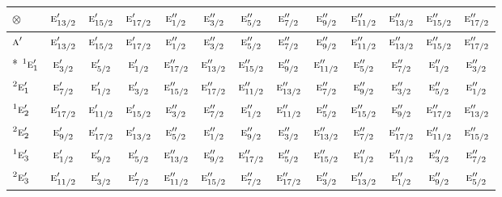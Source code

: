 \documentclass[10pt,a4paper]{article}
\numberwithin{equation}{section}
\newcommand{\irr}[1]{\text{\normalfont\scshape #1}}
\newcommand{\conjpair}[1]{{}^{#1}}
\newcommand{\irrprod}{\otimes}
\begin{document}
{\small\setlength{\tabcolsep}{3pt}\begin{longtable}{@{}lcccccccccccc@{}}\toprule
$\irrprod$ & $\irr{e}_{13/2}'$ & $\irr{e}_{15/2}'$ & $\irr{e}_{17/2}'$ & $\irr{e}_{1/2}''$ & $\irr{e}_{3/2}''$ & $\irr{e}_{5/2}''$ & $\irr{e}_{7/2}''$ & $\irr{e}_{9/2}''$ & $\irr{e}_{11/2}''$ & $\irr{e}_{13/2}''$ & $\irr{e}_{15/2}''$ & $\irr{e}_{17/2}''$\\\midrule\endhead
\bottomrule\endfoot\endlastfoot
$\irr{a}'$ & $\irr{e}_{13/2}'$ & $\irr{e}_{15/2}'$ & $\irr{e}_{17/2}'$ & $\irr{e}_{1/2}''$ & $\irr{e}_{3/2}''$ & $\irr{e}_{5/2}''$ & $\irr{e}_{7/2}''$ & $\irr{e}_{9/2}''$ & $\irr{e}_{11/2}''$ & $\irr{e}_{13/2}''$ & $\irr{e}_{15/2}''$ & $\irr{e}_{17/2}''$\\*
$\conjpair{1}\irr{e}_{1}'$ & $\irr{e}_{3/2}'$ & $\irr{e}_{5/2}'$ & $\irr{e}_{1/2}'$ & $\irr{e}_{17/2}''$ & $\irr{e}_{13/2}''$ & $\irr{e}_{15/2}''$ & $\irr{e}_{9/2}''$ & $\irr{e}_{11/2}''$ & $\irr{e}_{5/2}''$ & $\irr{e}_{7/2}''$ & $\irr{e}_{1/2}''$ & $\irr{e}_{3/2}''$\\
$\conjpair{2}\irr{e}_{1}'$ & $\irr{e}_{7/2}'$ & $\irr{e}_{1/2}'$ & $\irr{e}_{3/2}'$ & $\irr{e}_{15/2}''$ & $\irr{e}_{17/2}''$ & $\irr{e}_{11/2}''$ & $\irr{e}_{13/2}''$ & $\irr{e}_{7/2}''$ & $\irr{e}_{9/2}''$ & $\irr{e}_{3/2}''$ & $\irr{e}_{5/2}''$ & $\irr{e}_{1/2}''$\\
$\conjpair{1}\irr{e}_{2}'$ & $\irr{e}_{17/2}'$ & $\irr{e}_{11/2}'$ & $\irr{e}_{15/2}'$ & $\irr{e}_{3/2}''$ & $\irr{e}_{7/2}''$ & $\irr{e}_{1/2}''$ & $\irr{e}_{11/2}''$ & $\irr{e}_{5/2}''$ & $\irr{e}_{15/2}''$ & $\irr{e}_{9/2}''$ & $\irr{e}_{17/2}''$ & $\irr{e}_{13/2}''$\\
$\conjpair{2}\irr{e}_{2}'$ & $\irr{e}_{9/2}'$ & $\irr{e}_{17/2}'$ & $\irr{e}_{13/2}'$ & $\irr{e}_{5/2}''$ & $\irr{e}_{1/2}''$ & $\irr{e}_{9/2}''$ & $\irr{e}_{3/2}''$ & $\irr{e}_{13/2}''$ & $\irr{e}_{7/2}''$ & $\irr{e}_{17/2}''$ & $\irr{e}_{11/2}''$ & $\irr{e}_{15/2}''$\\
$\conjpair{1}\irr{e}_{3}'$ & $\irr{e}_{1/2}'$ & $\irr{e}_{9/2}'$ & $\irr{e}_{5/2}'$ & $\irr{e}_{13/2}''$ & $\irr{e}_{9/2}''$ & $\irr{e}_{17/2}''$ & $\irr{e}_{5/2}''$ & $\irr{e}_{15/2}''$ & $\irr{e}_{1/2}''$ & $\irr{e}_{11/2}''$ & $\irr{e}_{3/2}''$ & $\irr{e}_{7/2}''$\\
$\conjpair{2}\irr{e}_{3}'$ & $\irr{e}_{11/2}'$ & $\irr{e}_{3/2}'$ & $\irr{e}_{7/2}'$ & $\irr{e}_{11/2}''$ & $\irr{e}_{15/2}''$ & $\irr{e}_{7/2}''$ & $\irr{e}_{17/2}''$ & $\irr{e}_{3/2}''$ & $\irr{e}_{13/2}''$ & $\irr{e}_{1/2}''$ & $\irr{e}_{9/2}''$ & $\irr{e}_{5/2}''$\\

\end{longtable}}
\end{document}
